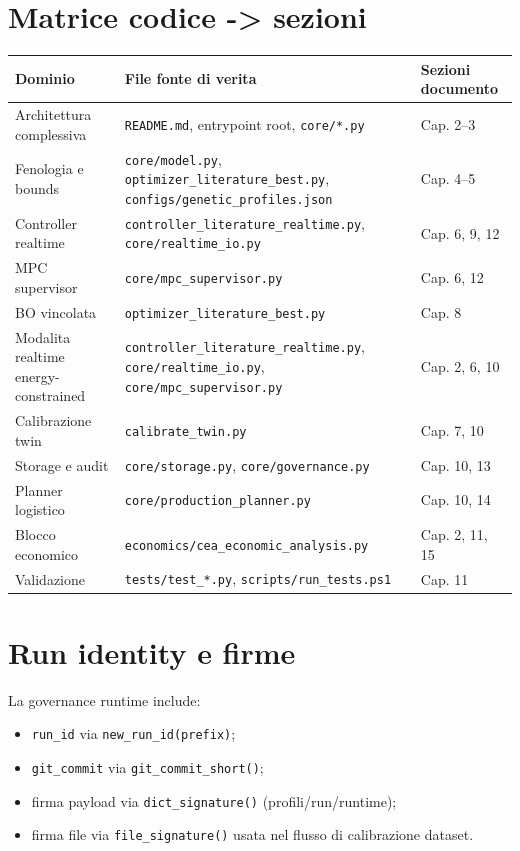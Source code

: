 ﻿\documentclass[11pt,a4paper]{report}
\begin{document}
\section{Matrice codice -> sezioni}
\begin{longtable}{@{}p{3.4cm}p{5.8cm}p{5.2cm}@{}}
\toprule
Dominio & File fonte di verita & Sezioni documento \\ \midrule
Architettura complessiva & \texttt{README.md}, entrypoint root, \texttt{core/*.py} & Cap. 2--3 \\
Fenologia e bounds & \texttt{core/model.py}, \texttt{optimizer\_literature\_best.py}, \texttt{configs/genetic\_profiles.json} & Cap. 4--5 \\
Controller realtime & \texttt{controller\_literature\_realtime.py}, \texttt{core/realtime\_io.py} & Cap. 6, 9, 12 \\
MPC supervisor & \texttt{core/mpc\_supervisor.py} & Cap. 6, 12 \\
BO vincolata & \texttt{optimizer\_literature\_best.py} & Cap. 8 \\
Modalita realtime energy-constrained & \texttt{controller\_literature\_realtime.py}, \texttt{core/realtime\_io.py}, \texttt{core/mpc\_supervisor.py} & Cap. 2, 6, 10 \\
Calibrazione twin & \texttt{calibrate\_twin.py} & Cap. 7, 10 \\
Storage e audit & \texttt{core/storage.py}, \texttt{core/governance.py} & Cap. 10, 13 \\
Planner logistico & \texttt{core/production\_planner.py} & Cap. 10, 14 \\
Blocco economico & \texttt{economics/cea\_economic\_analysis.py} & Cap. 2, 11, 15 \\
Validazione & \texttt{tests/test\_*.py}, \texttt{scripts/run\_tests.ps1} & Cap. 11 \\
\bottomrule
\end{longtable}

\section{Run identity e firme}
La governance runtime include:
\begin{itemize}
  \item \texttt{run\_id} via \texttt{new\_run\_id(prefix)};
  \item \texttt{git\_commit} via \texttt{git\_commit\_short()};
  \item firma payload via \texttt{dict\_signature()} (profili/run/runtime);
  \item firma file via \texttt{file\_signature()} usata nel flusso di calibrazione dataset.
\end{itemize}
\end{document}
